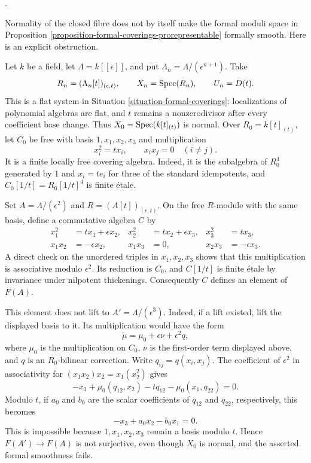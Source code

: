 \begin{remark}
\label{remark-formal-coverings-normal-not-smooth}
\begin{reference}
\cite[Expos\'e 195, C, Section 5, pp. 389--390]{FGA}.
\end{reference}
Normality of the closed fibre does not by itself make the formal moduli space
in Proposition \ref{proposition-formal-coverings-prorepresentable} formally
smooth. Here is an explicit obstruction.

Let $k$ be a field, let $\Lambda = k[[\epsilon]]$, and put
$\Lambda_n = \Lambda/(\epsilon^{n + 1})$. Take
$$
R_n = (\Lambda_n[t])_{(\epsilon, t)},
\qquad
X_n = \mathop{\mathrm{Spec}}(R_n),
\qquad
U_n = D(t).
$$
This is a flat system in Situation \ref{situation-formal-coverings}:
localizations of polynomial algebras are flat, and $t$ remains a
nonzerodivisor after every coefficient base change. Thus
$X_0 = \mathop{\mathrm{Spec}}(k[t]_{(t)})$ is normal. Over $R_0 = k[t]_{(t)}$, let $C_0$
be free with basis $1, x_1, x_2, x_3$ and multiplication
$$
x_i^2 = t x_i,
\qquad
x_i x_j = 0 \quad (i \ne j).
$$
It is a finite locally free covering algebra. Indeed, it is the subalgebra
of $R_0^4$ generated by $1$ and $x_i = t e_i$ for three of the standard
idempotents, and $C_0[1/t] = R_0[1/t]^4$ is finite \'etale.

Set $A = \Lambda/(\epsilon^2)$ and
$R=(A[t])_{(\epsilon,t)}$. On the free $R$-module with the same basis,
define a commutative algebra $C$ by
\begin{align*}
x_1^2 &= t x_1 + \epsilon x_2, &
x_2^2 &= t x_2 + \epsilon x_3, &
x_3^2 &= t x_3, \\
x_1x_2 &= -\epsilon x_2, &
x_1x_3 &= 0, &
x_2x_3 &= -\epsilon x_3.
\end{align*}
A direct check on the unordered triples in $x_1,x_2,x_3$ shows that this
multiplication is associative modulo $\epsilon^2$. Its reduction is $C_0$,
and $C[1/t]$ is finite \'etale by invariance under nilpotent thickenings.
Consequently $C$ defines an element of $F(A)$.

This element does not lift to $A' = \Lambda/(\epsilon^3)$. Indeed, if a lift
existed, lift the displayed basis to it. Its multiplication would have the
form
$$
\widetilde\mu = \mu_0 + \epsilon\nu + \epsilon^2q,
$$
where $\mu_0$ is the multiplication on $C_0$, $\nu$ is the first-order term
displayed above, and $q$ is an $R_0$-bilinear correction. Write
$q_{ij}=q(x_i,x_j)$. The coefficient of $\epsilon^2$ in associativity for
$(x_1x_2)x_2=x_1(x_2^2)$ gives
$$
-x_3 + \mu_0(q_{12},x_2) - tq_{12} - \mu_0(x_1,q_{22}) = 0.
$$
Modulo $t$, if $a_0$ and $b_0$ are the scalar coefficients of $q_{12}$ and
$q_{22}$, respectively, this becomes
$$
-x_3 + a_0x_2 - b_0x_1 = 0.
$$
This is impossible because $1,x_1,x_2,x_3$ remain a basis modulo $t$.
Hence $F(A') \to F(A)$ is not surjective, even though $X_0$ is normal, and
the asserted formal smoothness fails.
\end{remark}




